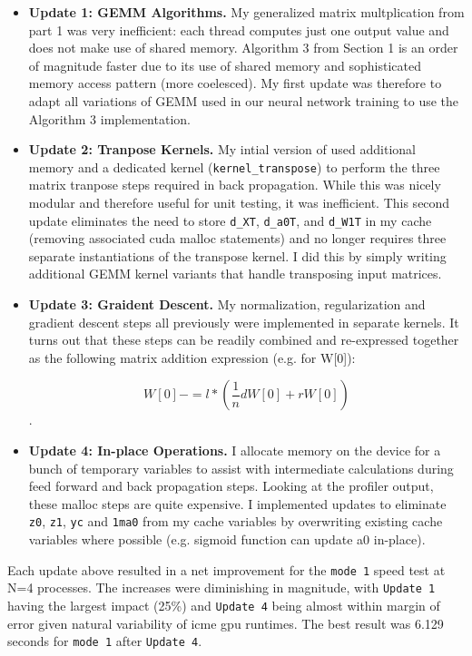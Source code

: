 \documentclass[12pt,letterpaper,twoside]{article}
\begin{document}
\begin{itemize}
    \item \textbf{Update 1: GEMM Algorithms.} My generalized matrix multplication 
    from part 1 was very inefficient: each thread computes just one output value 
    and does not make use of shared memory. Algorithm 3 from Section 1 is an order
    of magnitude faster due to its use of shared memory and sophisticated memory 
    access pattern (more coelesced). My first update was therefore to adapt all 
    variations of GEMM used in our neural network training to use the Algorithm 
    3 implementation.  

    \item \textbf{Update 2: Tranpose Kernels.} My intial version of used  
    additional memory and a dedicated kernel (\texttt{kernel\_transpose}) to 
    perform the three matrix tranpose steps required in back propagation. 
    While this was nicely modular and therefore useful for unit testing, 
    it was inefficient. This second update eliminates the need to store 
    \texttt{d\_XT}, \texttt{d\_a0T}, and \texttt{d\_W1T} in my cache (removing 
    associated cuda malloc statements) and no longer requires three separate 
    instantiations of the transpose kernel. I did this by simply writing 
    additional GEMM kernel variants that handle transposing input matrices.

    \item \textbf{Update 3: Graident Descent.} My normalization, regularization 
    and gradient descent steps all previously were implemented in separate kernels.
    It turns out that these steps can be readily combined and re-expressed together 
    as the following matrix addition expression (e.g. for W[0]): 
    
    $$W[0] \mathrel{{-}{=}} l*(\frac{1}{n} dW[0] + r W[0])$$.  
    
    \item \textbf{Update 4: In-place Operations.} I allocate memory on the device for 
    a bunch of temporary variables to assist with intermediate calculations during 
    feed forward and back propagation steps. Looking at the profiler output, these 
    malloc steps are quite expensive. I implemented updates to eliminate \texttt{z0}, 
    \texttt{z1}, \texttt{yc} and \texttt{1ma0} from my cache variables by overwriting 
    existing cache variables where possible (e.g. sigmoid function can update a0 in-place). 
\end{itemize}

Each update above resulted in a net improvement for the \texttt{mode 1} speed test at 
N=4 processes. The increases were diminishing in magnitude, with \texttt{Update 1}
having the largest impact (25\%) and \texttt{Update 4} being almost within margin 
of error given natural variability of icme gpu runtimes. The best result was 6.129 
seconds for \texttt{mode 1} after \texttt{Update 4}.  
\end{document}
